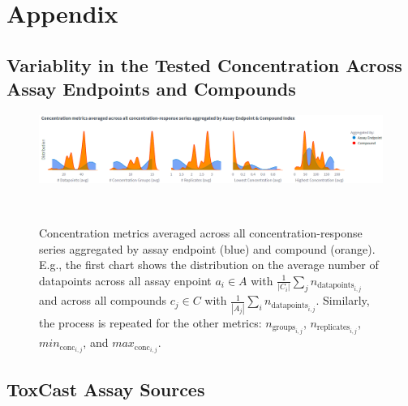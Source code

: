 \chapter{Appendix}\label{chap:appendix}
\section{Variablity in the Tested Concentration Across Assay Endpoints and Compounds}\label{sec:variability}
\begin{figure}[h]  %
    \centering
    \includegraphics[width=1.0\textwidth]{figures/concentration_metric_distributions.png}  
    \caption{Concentration metrics averaged across all concentration-response series aggregated by assay endpoint (blue) and compound (orange). E.g., the first chart shows the distribution on the average number of datapoints across all assay enpoint $a_i \in A$ with $\frac{1}{|C_i|} \sum_{j} n_{\text{datapoints}_{i,j}}$ and across all compounds $c_j \in C$ with $\frac{1}{|A_j|} \sum_{i} n_{\text{datapoints}_{i,j}}$. Similarly, the process is repeated for the other metrics: $n_{\text{groups}_{i,j}}$, $n_{\text{replicates}_{i,j}}$, $min_{\text{conc}_{i,j}}$, and $max_{\text{conc}_{i,j}}$.
    }
~\label{fig:concentration_metric_distributions} 
\end{figure}

\newpage

\section{ToxCast Assay Sources}\label{sec:assay_source_names}

